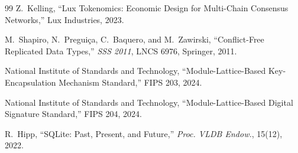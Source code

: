 \begin{thebibliography}{99}
Z.~Kelling,
``Lux Tokenomics: Economic Design for Multi-Chain Consensus Networks,''
Lux Industries, 2023.

M.~Shapiro, N.~Pregui\c{c}a, C.~Baquero, and M.~Zawirski,
``Conflict-Free Replicated Data Types,''
\textit{SSS 2011}, LNCS 6976, Springer, 2011.

{National Institute of Standards and Technology},
``Module-Lattice-Based Key-Encapsulation Mechanism Standard,''
FIPS 203, 2024.

{National Institute of Standards and Technology},
``Module-Lattice-Based Digital Signature Standard,''
FIPS 204, 2024.

R.~Hipp,
``SQLite: Past, Present, and Future,''
\textit{Proc. VLDB Endow.}, 15(12), 2022.

\end{thebibliography}

